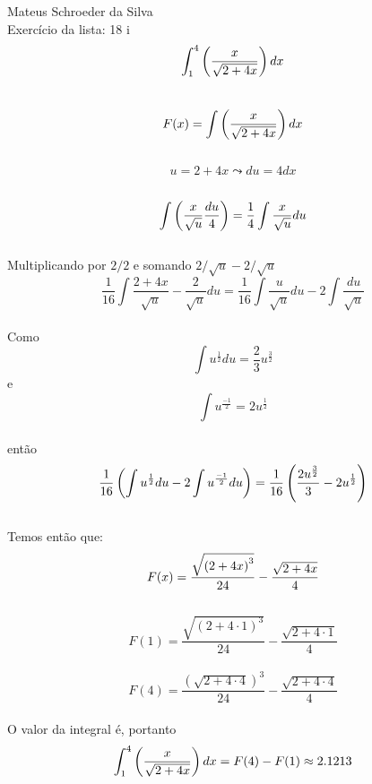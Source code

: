 \documentclass{article}
\begin{document}
    Mateus Schroeder da Silva \\
    Exercício da lista: 18 i \\

    $$ \int_1^4 \left( \dfrac{x}{\sqrt{2+4x} } \right) dx $$ \\
    $$ F(x) = \int \left( \dfrac{x}{\sqrt{2+4x}}  \right) dx $$ \\
    $$ u = 2+4x \leadsto du = 4dx $$ \\
    $$ \int \left(  \dfrac{x}{\sqrt{u} } \dfrac{du}{4}  \right) = \dfrac{1}{4} \int \dfrac{x}{\sqrt{u}} du $$ \\
    Multiplicando por $2/2$ e somando $ 2/\sqrt{u} - 2/\sqrt{u}$
    $$ \dfrac{1}{16} \int {\dfrac{2+4x}{\sqrt{u} } - \dfrac{2}{\sqrt{u}} } du = 
    \dfrac{1}{16} \int { \dfrac{u}{ \sqrt{u} } du } - 2 \int \dfrac{du}{\sqrt{u}}$$ \\
    Como 
    $$ \int { u^{ \frac{1}{2} } } du = \frac{2}{3} u^{ \frac{3}{2} }$$ e \\
    $$ \int { u^{\frac{-1}{2} } = 2u^{\frac{1}{2} }}  $$ \\
    então
    $$ \dfrac{1}{16} \left(  \int { u^{\frac{1}{2} } du } - 2 \int {u^{\frac{-1}{2}} du}  \right) = \dfrac{1}{16} \left( \dfrac{2u^\frac{3}{2} }{3} - 2u^\frac{1}{2}  \right)$$ \\
    Temos então que:
    $$ F(x) = \dfrac{\sqrt{ \left( 2+4x \right)^3 } }{24} - \dfrac{\sqrt{2+4x } }{4} $$ \\
    $$ F(1) = \dfrac{\sqrt{ (2+ 4 \cdot 1) ^3}}{24} - \dfrac{\sqrt{2+4 \cdot 1}}{4} $$ \\
    $$ F(4) = \dfrac{ ( \sqrt{2+ 4 \cdot 4 })^3 }{24} - \dfrac{\sqrt{ 2 + 4 \cdot 4} }{4}$$ \\
    O valor da integral é, portanto
    $$ \int_1^4 \left( \dfrac{x}{\sqrt{2+4x} } \right) dx = F(4) - F(1) \approx 2.1213 $$ \\
    $$ $$ \\
    $$ $$ \\
    $$ $$ \\
\end{document}
